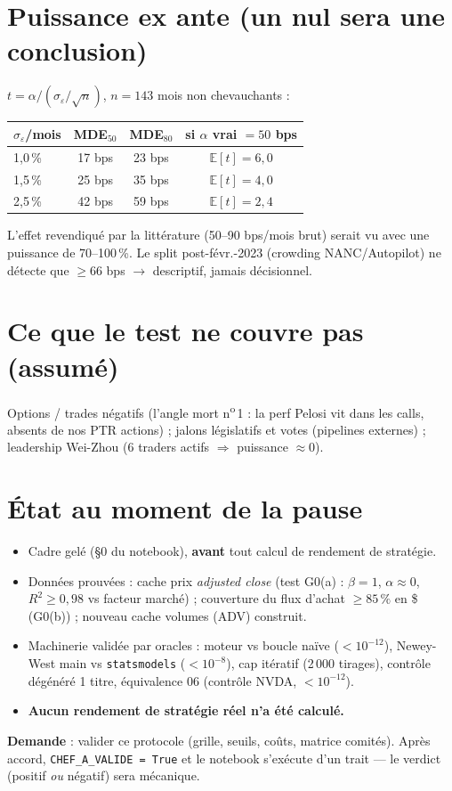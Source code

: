 \documentclass[10pt,a4paper,twocolumn]{article}
\begin{document}
\section{Puissance ex ante (un nul sera une conclusion)}
$t=\alpha/(\sigma_\varepsilon/\sqrt{n})$, $n=143$ mois non chevauchants :
\begin{center}\small
\begin{tabular}{@{}lccc@{}}
\toprule
$\sigma_\varepsilon$/mois & MDE$_{50}$ & MDE$_{80}$ & si $\alpha$ vrai $=50$ bps \\
\midrule
1,0\,\% & 17 bps & 23 bps & $\mathbb{E}[t]=6{,}0$ \\
1,5\,\% & 25 bps & 35 bps & $\mathbb{E}[t]=4{,}0$ \\
2,5\,\% & 42 bps & 59 bps & $\mathbb{E}[t]=2{,}4$ \\
\bottomrule
\end{tabular}
\end{center}
L'effet revendiqué par la littérature (50--90 bps/mois brut) serait vu avec une puissance de 70--100\,\%. Le split post-févr.-2023 (crowding NANC/Autopilot) ne détecte que $\geq66$ bps $\to$ descriptif, jamais décisionnel.

\section{Ce que le test ne couvre pas (assumé)}
Options / trades négatifs (l'angle mort n\textsuperscript{o}\,1 : la perf \og Pelosi\fg{} vit dans les calls, absents de nos PTR actions) ; jalons législatifs et votes (pipelines externes) ; leadership Wei-Zhou (6 traders actifs $\Rightarrow$ puissance $\approx0$).

\section{État au moment de la pause}
\begin{itemize}
  \item Cadre gelé (\S0 du notebook), \textbf{avant} tout calcul de rendement de stratégie.
  \item Données prouvées : cache prix \emph{adjusted close} (test G0(a) : $\beta=1$, $\alpha\approx0$, $R^2\geq0{,}98$ vs facteur marché) ; couverture du flux d'achat $\geq85\,\%$ en \$ (G0(b)) ; nouveau cache volumes (ADV) construit.
  \item Machinerie validée par oracles : moteur vs boucle naïve ($<10^{-12}$), Newey-West main vs \texttt{statsmodels} ($<10^{-8}$), cap itératif (2\,000 tirages), contrôle dégénéré 1 titre, équivalence 06 (contrôle NVDA, $<10^{-12}$).
  \item \textbf{Aucun rendement de stratégie réel n'a été calculé.}
\end{itemize}
\vspace{2pt}
\textbf{Demande} : valider ce protocole (grille, seuils, coûts, matrice comités). Après accord, \texttt{CHEF\_A\_VALIDE = True} et le notebook s'exécute d'un trait --- le verdict (positif \emph{ou} négatif) sera mécanique.
\end{document}
